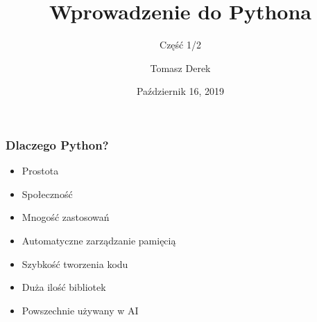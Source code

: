 \documentclass[17pt]{beamer}
\title{Wprowadzenie do Pythona}
\subtitle{Część 1/2}
\author{Tomasz Derek}
\institute{KMS}
\date{Październik 16, 2019}
\begin{document}
 
\frame{\titlepage}
 
\begin{frame}
\frametitle{Dlaczego Python?}
\begin{itemize}
\item Prostota
\item Społeczność
\item Mnogość zastosowań
\item Automatyczne zarządzanie pamięcią
\item Szybkość tworzenia kodu
\item Duża ilość bibliotek
\item Powszechnie używany w AI
\end{itemize}
\end{frame}
\end{document}
